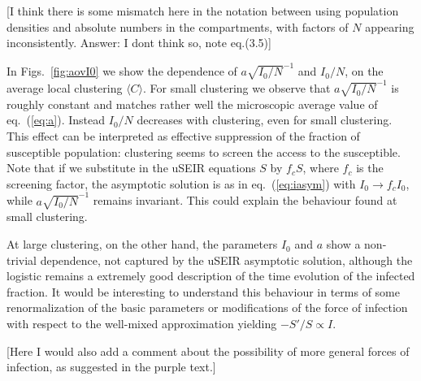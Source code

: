 \documentclass[a4paper,oneside,11pt]{article}
\newcommand{\mycomment}[1]{\textcolor[rgb]{0.75,0,0}{[#1]}}
\begin{document}
 \mycomment{I think there is some mismatch here in the notation between using population densities and absolute numbers in the compartments, with factors of $N$ appearing inconsistently. Answer: I dont think so, note eq.(3.5)}

 In Figs.~\ref{fig:aovI0} we show the dependence of
$a \sqrt{I_0/N}^{-1}$ and $I_0/N$, on the average local clustering $\langle C \rangle$. For small clustering we observe that $a \sqrt{I_0/N}^{-1}$ is roughly constant and  matches rather well the microscopic average value of eq.~(\ref{eq:a}). Instead $I_0/N$ decreases with clustering, even for small clustering. This effect can be interpreted as effective suppression of the fraction of susceptible population: clustering seems to screen the access to the susceptible. Note that if we substitute in the uSEIR equations $S$ by $f_c S$, where $f_c$ is the screening factor, the asymptotic solution is as in eq.~(\ref{eq:iasym})
with $I_0 \rightarrow f_c I_0$, while $a \sqrt{I_0/N}^{-1}$ remains invariant. This could explain the behaviour found at small clustering. 

At large clustering, on the other hand, the parameters $I_0$ and $a$ show a non-trivial dependence, not captured by the uSEIR asymptotic solution, although the logistic remains a extremely good description of the time evolution of the infected fraction. It would be interesting to understand this behaviour in terms of some renormalization of the basic parameters
or modifications of the force of infection with respect to the well-mixed approximation yielding
$-S'/S \propto I$.

\mycomment{Here I would also add a comment about the possibility of more general forces of infection, as suggested in the purple text.}
\end{document}
